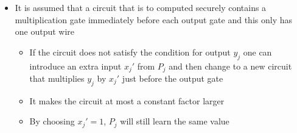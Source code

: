 \begin{itemize}
  \item It is assumed that a circuit that is to computed securely contains a multiplication gate immediately before each output gate and this only has one output wire
  \begin{itemize}
  	\item If the circuit does not satisfy the condition for output $y_j$ one can introduce an extra input $x_j'$ from $P_j$ and then change to a new circuit that multiplies $y_j$ by $x_j'$ just before the output gate
  	\item It makes the circuit at most a constant factor larger
  	\item By choosing $x_j' = 1$, $P_j$ will still learn the same value
  \end{itemize}
\end{itemize}

